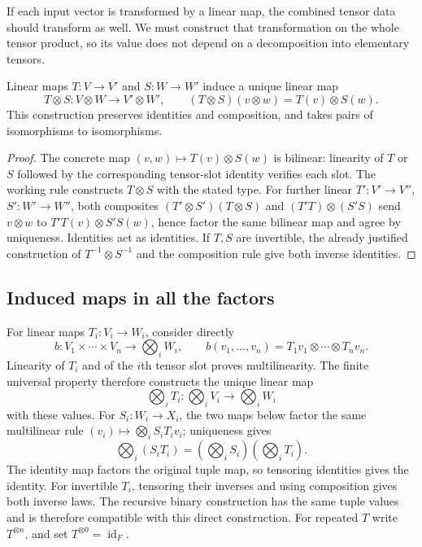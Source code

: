 If each input vector is transformed by a linear map, the combined tensor
data should transform as well. We must construct that transformation on
the whole tensor product, so its value does not depend on a decomposition
into elementary tensors.

\begin{proposition}\label{prop:binary-tensor-maps}
Linear maps $T:V\to V'$ and $S:W\to W'$ induce a unique linear map
\[
T\otimes S:V\otimes W\longrightarrow V'\otimes W',\qquad
(T\otimes S)(v\otimes w)=T(v)\otimes S(w).
\]
This construction preserves identities and composition, and takes pairs
of isomorphisms to isomorphisms.
\end{proposition}
\begin{proof}
The concrete map $(v,w)\mapsto T(v)\otimes S(w)$ is bilinear: linearity
of $T$ or $S$ followed by the corresponding tensor-slot identity verifies
each slot. The working rule constructs $T\otimes S$ with the stated type.
For further linear $T':V'\to V''$, $S':W'\to W''$, both composites
$(T'\otimes S')(T\otimes S)$ and $(T'T)\otimes(S'S)$ send $v\otimes w$
to $T'T(v)\otimes S'S(w)$, hence factor the same bilinear map and agree
by uniqueness. Identities act as
identities. If $T,S$ are invertible, the already justified construction
of $T^{-1}\otimes S^{-1}$ and the composition rule give both inverse identities.
\end{proof}

\subsection{Induced maps in all the factors}
For linear maps $T_i:V_i\to W_i$, consider directly
\[
b:V_1\times\cdots\times V_n\longrightarrow\bigotimes_iW_i,
\qquad b(v_1,\ldots,v_n)=T_1v_1\otimes\cdots\otimes T_nv_n.
\]
Linearity of $T_i$ and of the $i$th tensor slot proves multilinearity.
The finite universal property therefore constructs the unique linear map
\[
\bigotimes_iT_i:\bigotimes_iV_i\longrightarrow\bigotimes_iW_i
\]
with these values. For $S_i:W_i\to X_i$, the two maps below factor the
same multilinear rule $(v_i)\mapsto\bigotimes_i S_iT_iv_i$; uniqueness gives
\[
\bigotimes_i(S_iT_i)=(\bigotimes_iS_i)(\bigotimes_iT_i).
\]
The identity map factors the original tuple map, so tensoring identities
gives the identity. For invertible $T_i$, tensoring their inverses and
using composition gives both inverse laws. The recursive binary construction
has the same tuple values and is therefore compatible with this direct
construction. For repeated $T$ write $T^{\otimes n}$, and set
$T^{\otimes0}=\operatorname{id}_F$.


